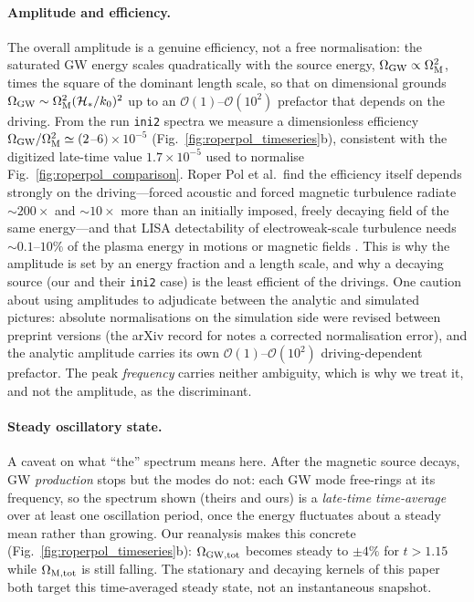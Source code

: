 \documentclass[10pt,prd,aps,nobibnotes,superscriptaddress,preprintnumbers,notitlepage]{revtex4-1}
\begin{document}
\paragraph{Amplitude and efficiency.} The overall amplitude is a genuine efficiency, not a
free normalisation: the saturated GW energy scales quadratically with the source energy,
$\Omega_{\rm GW}\propto\Omega_{\rm M}^2$, times the square of the dominant length scale, so
that on dimensional grounds $\Omega_{\rm GW}\sim\Omega_{\rm M}^2(\mathcal H_\ast/k_0)^2$ up to
an $\mathcal O(1)$--$\mathcal O(10^2)$ prefactor that depends on the driving. From the run
\texttt{ini2} spectra we measure a dimensionless efficiency
$\Omega_{\rm GW}/\Omega_{\rm M}^2\simeq(2$--$6)\times10^{-5}$ (Fig.~\ref{fig:roperpol_timeseries}b),
consistent with the digitized late-time value $1.7\times10^{-5}$ used to normalise
Fig.~\ref{fig:roperpol_comparison}. Roper Pol et al.\ find the efficiency itself depends
strongly on the driving---forced acoustic and forced magnetic turbulence radiate
$\sim\!200\times$ and $\sim\!10\times$ more than an initially imposed, freely decaying field of
the same energy---and that LISA detectability of electroweak-scale turbulence needs
$\sim0.1$--$10\%$ of the plasma energy in motions or magnetic fields \cite{RoperPol:2019wvy}. This
is why the amplitude is set by an energy fraction and a length scale, and why a decaying source
(our and their \texttt{ini2} case) is the least efficient of the drivings. One caution about
using amplitudes to adjudicate between the analytic and simulated pictures: absolute
normalisations on the simulation side were revised between preprint versions (the arXiv
record for \cite{RoperPol:2019wvy} notes a corrected normalisation error), and the analytic
amplitude carries its own $\mathcal{O}(1)$--$\mathcal{O}(10^2)$ driving-dependent prefactor.
The peak \emph{frequency} carries neither ambiguity, which is why we treat it, and not the
amplitude, as the discriminant.

\paragraph{Steady oscillatory state.} A caveat on what ``the'' spectrum means here. After the
magnetic source decays, GW \emph{production} stops but the modes do not: each GW mode free-rings
at its frequency, so the spectrum shown (theirs \cite{RoperPol:2019wvy} and ours) is a
\emph{late-time time-average} over at least one oscillation period, once the
energy fluctuates about a steady mean rather than growing. Our reanalysis makes this concrete
(Fig.~\ref{fig:roperpol_timeseries}b): $\Omega_{\rm GW,tot}$ becomes steady to $\pm4\%$ for
$t>1.15$ while $\Omega_{\rm M,tot}$ is still falling. The stationary and decaying kernels of
this paper both target this time-averaged steady state, not an instantaneous snapshot.
\end{document}
